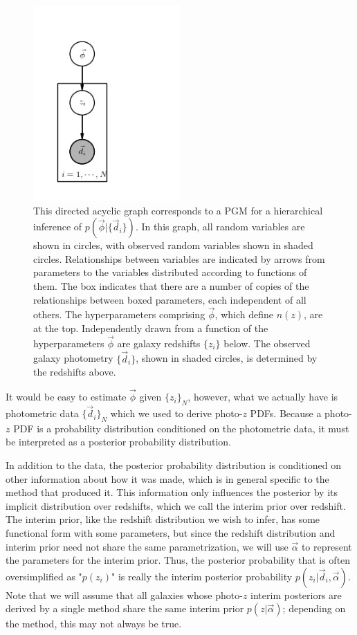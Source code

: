\documentclass[iop]{emulateapj}
\begin{document}
\begin{figure}
	\begin{center}
		\includegraphics[width=0.5\textwidth]{pgm.png}
		\caption{This directed acyclic graph corresponds to a PGM for a hierarchical inference of $p(\vec{\phi}|\{\vec{d}_{i}\})$.  In this graph, all random variables are shown in circles, with observed random variables shown in shaded circles.  Relationships between variables are indicated by arrows from parameters to the variables distributed according to functions of them.  The box indicates that there are a number of copies of the relationships between boxed parameters, each independent of all others.  The hyperparameters comprising $\vec{\phi}$, which define $n(z)$, are at the top.  Independently drawn from a function of the hyperparameters $\vec{\phi}$ are galaxy redshifts $\{z_{i}\}$ below.  The observed galaxy photometry $\{\vec{d}_{i}\}$, shown in shaded circles, is determined by the redshifts above.}
	\label{fig:pgm}
	\end{center}
\end{figure}

It would be easy to estimate $\vec{\phi}$ given $\{z_{i}\}_{N}$, however, what we actually have is photometric data $\{\vec{d}_{i}\}_{N}$ which we used to derive photo-$z$ PDFs.  Because a photo-$z$ PDF is a probability distribution conditioned on the photometric data, it must be interpreted as a posterior probability distribution.  

In addition to the data, the posterior probability distribution is conditioned on other information about how it was made, which is in general specific to the method that produced it.  This information only influences the posterior by its implicit distribution over redshifts, which we call the interim prior over redshift.  The interim prior, like the redshift distribution we wish to infer, has some functional form with some parameters, but since the redshift distribution and interim prior need not share the same parametrization, we will use $\vec{\alpha}$ to represent the parameters for the interim prior.  Thus, the posterior probability that is often oversimplified as "$p(z_{i})$" is really the interim posterior probability $p(z_{i} | \vec{d}_{i}, \vec{\alpha})$.  Note that we will assume that all galaxies whose photo-$z$ interim posteriors are derived by a single method share the same interim prior $p(z | \vec{\alpha})$; depending on the method, this may not always be true.
\end{document}

